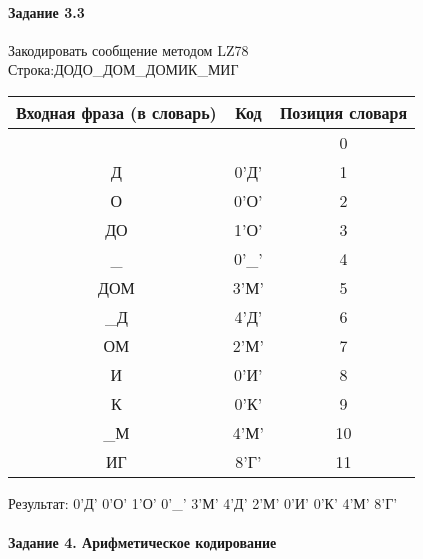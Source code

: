 \documentclass[a4paper, 12pt]{article}
\begin{document}
\paragraph{Задание 3.3}

Закодировать сообщение методом LZ78\\
Строка:ДОДО\_ДОМ\_ДОМИК\_МИГ\\
\begin{table}[h!]
\centering
\begin{tabular}{|c|c|c|} 
\hline
 Входная фраза (в словарь) & Код & Позиция словаря \\ \hline

 &  & 0 \\ \hline
Д & 0'Д' & 1 \\ \hline
О & 0'О' & 2 \\ \hline
ДО & 1'О' & 3 \\ \hline
\_ & 0'\_' & 4 \\ \hline
ДОМ & 3'М' & 5 \\ \hline
\_Д & 4'Д' & 6 \\ \hline
ОМ & 2'М' & 7 \\ \hline
И & 0'И' & 8 \\ \hline
К & 0'К' & 9 \\ \hline
\_М & 4'М' & 10 \\ \hline
ИГ & 8'Г' & 11 \\ \hline
\end{tabular}
\end{table}

Результат: 0'Д' 0'О' 1'О' 0'\_' 3'М' 4'Д' 2'М' 0'И' 0'К' 4'М' 8'Г'\\
\pagebreak
\paragraph{Задание 4. Арифметическое кодирование\\}
\end{document}
